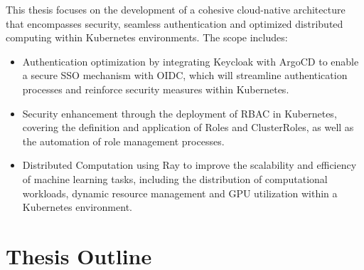 This thesis focuses on the development of a cohesive cloud-native architecture that encompasses security, seamless authentication and optimized distributed computing within Kubernetes environments. The scope includes:

\begin{itemize}

\item Authentication optimization by integrating Keycloak with ArgoCD to enable a secure SSO mechanism with OIDC, which will streamline authentication processes and reinforce security measures within Kubernetes. \cite{r7}

\item Security enhancement through the deployment of RBAC in Kubernetes, covering the definition and application of Roles and ClusterRoles, as well as the automation of role management processes. \cite{r6}

\item Distributed Computation using Ray to improve the scalability and efficiency of machine learning tasks, including the distribution of computational workloads, dynamic resource management and GPU utilization within a Kubernetes environment. \cite{r8}
\end{itemize}

\clearpage

\section{Thesis Outline}

